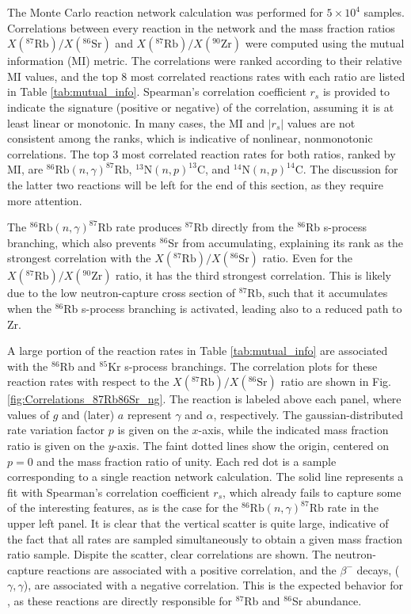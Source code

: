 The Monte Carlo reaction network calculation was performed for $5 \times 10^{4}$ samples. Correlations between every reaction in the network and the mass fraction ratios $X(^{87}\mathrm{Rb})/X(^{86}\mathrm{Sr})$ and $X(^{87}\mathrm{Rb})/X(^{90}\mathrm{Zr})$ were computed using the mutual information (MI) metric. The correlations were ranked according to their relative MI values, and the top 8 most correlated reactions rates with each ratio are listed in Table \ref{tab:mutual_info}. Spearman's correlation coefficient $r_{s}$ is provided to indicate the signature (positive or negative) of the correlation, assuming it is at least linear or monotonic. In many cases, the MI and $|r_{s}|$ values are not consistent among the ranks, which is indicative of nonlinear, nonmonotonic correlations. The top 3 most correlated reaction rates for both ratios, ranked by MI, are $^{86}\mathrm{Rb}(n,\gamma)^{87}\mathrm{Rb}$, $^{13}\mathrm{N}(n,p)^{13}\mathrm{C}$, and $^{14}\mathrm{N}(n,p)^{14}\mathrm{C}$. The discussion for the latter two reactions will be left for the end of this section, as they require more attention.

The $^{86}\mathrm{Rb}(n,\gamma)^{87}\mathrm{Rb}$ rate produces $^{87}$Rb directly from the $^{86}$Rb s-process branching, which also prevents $^{86}$Sr from accumulating, explaining its rank as the strongest correlation with the $X(^{87}\mathrm{Rb})/X(^{86}\mathrm{Sr})$ ratio. Even for the $X(^{87}\mathrm{Rb})/X(^{90}\mathrm{Zr})$ ratio, it has the third strongest correlation. This is likely due to the low neutron-capture cross section of $^{87}$Rb, such that it accumulates when the $^{86}$Rb s-process branching is activated, leading also to a reduced path to Zr.

A large portion of the reaction rates in Table \ref{tab:mutual_info} are associated with the $^{86}$Rb and $^{85}$Kr s-process branchings. The correlation plots for these reaction rates with respect to the $X(^{87}\mathrm{Rb})/X(^{86}\mathrm{Sr})$ ratio are shown in Fig. \ref{fig:Correlations_87Rb86Sr_ng}. The reaction is labeled above each panel, where values of $g$ and (later) $a$ represent $\gamma$ and $\alpha$, respectively. The gaussian-distributed rate variation factor $p$ is given on the $x$-axis, while the indicated mass fraction ratio is given on the $y$-axis. The faint dotted lines show the origin, centered on $p=0$ and the mass fraction ratio of unity. Each red dot is a sample corresponding to a single reaction network calculation. The solid line represents a fit with Spearman's correlation coefficient $r_{s}$, which already fails to capture some of the interesting features, as is the case for the $^{86}\mathrm{Rb}(n,\gamma)^{87}\mathrm{Rb}$ rate in the upper left panel. It is clear that the vertical scatter is quite large, indicative of the fact that all rates are sampled simultaneously to obtain a given mass fraction ratio sample. Dispite the scatter, clear correlations are shown. The neutron-capture reactions are associated with a positive correlation, and the $\beta^{-}$ decays, ($\gamma,\gamma$), are associated with a negative correlation. This is the expected behavior for , as these reactions are directly responsible for $^{87}$Rb and $^{86}$Sr abundance.


